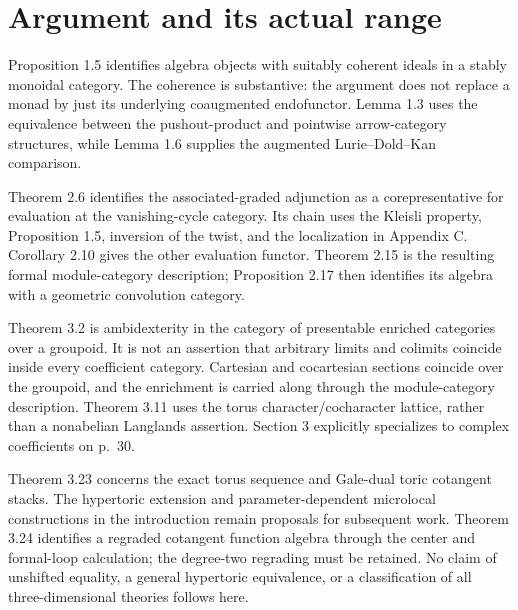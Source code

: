 \documentclass[10pt]{article}
\begin{document}
\section*{Argument and its actual range}
Proposition 1.5 identifies algebra objects with suitably coherent ideals in a stably monoidal category. The coherence is substantive: the argument does not replace a monad by just its underlying coaugmented endofunctor. Lemma 1.3 uses the equivalence between the pushout-product and pointwise arrow-category structures, while Lemma 1.6 supplies the augmented Lurie–Dold–Kan comparison.\par
Theorem 2.6 identifies the associated-graded adjunction as a corepresentative for evaluation at the vanishing-cycle category. Its chain uses the Kleisli property, Proposition 1.5, inversion of the twist, and the localization in Appendix C. Corollary 2.10 gives the other evaluation functor. Theorem 2.15 is the resulting formal module-category description; Proposition 2.17 then identifies its algebra with a geometric convolution category.\par
Theorem 3.2 is ambidexterity in the category of presentable enriched categories over a groupoid. It is not an assertion that arbitrary limits and colimits coincide inside every coefficient category. Cartesian and cocartesian sections coincide over the groupoid, and the enrichment is carried along through the module-category description. Theorem 3.11 uses the torus character/cocharacter lattice, rather than a nonabelian Langlands assertion. Section 3 explicitly specializes to complex coefficients on p. 30.\par
Theorem 3.23 concerns the exact torus sequence and Gale-dual toric cotangent stacks. The hypertoric extension and parameter-dependent microlocal constructions in the introduction remain proposals for subsequent work. Theorem 3.24 identifies a regraded cotangent function algebra through the center and formal-loop calculation; the degree-two regrading must be retained. No claim of unshifted equality, a general hypertoric equivalence, or a classification of all three-dimensional theories follows here.\par
\end{document}
